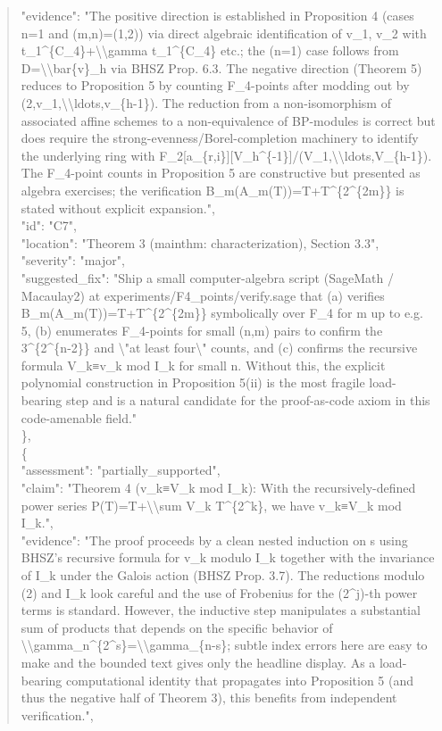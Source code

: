 \documentclass[11pt]{article}
\begin{document}
\begin{quote}
      "evidence": "The positive direction is established in Proposition 4 (cases n=1 and (m,n)=(1,2)) via direct algebraic identification of v\_1, v\_2 with t\_1\^{}\{C\_4\}+\textbackslash{}\textbackslash{}gamma t\_1\^{}\{C\_4\} etc.; the (n=1) case follows from D=\textbackslash{}\textbackslash{}bar\{v\}\_h via BHSZ Prop. 6.3. The negative direction (Theorem 5) reduces to Proposition 5 by counting F\_4-points after modding out by (2,v\_1,\textbackslash{}\textbackslash{}ldots,v\_\{h-1\}). The reduction from a non-isomorphism of associated affine schemes to a non-equivalence of BP-modules is correct but does require the strong-evenness/Borel-completion machinery to identify the underlying ring with F\_2[a\_\{r,i\}][V\_h\^{}\{-1\}]/(V\_1,\textbackslash{}\textbackslash{}ldots,V\_\{h-1\}). The F\_4-point counts in Proposition 5 are constructive but presented as algebra exercises; the verification B\_m(A\_m(T))=T+T\^{}\{2\^{}\{2m\}\} is stated without explicit expansion.",\\
      "id": "C7",\\
      "location": "Theorem 3 (mainthm: characterization), Section 3.3",\\
      "severity": "major",\\
      "suggested\_fix": "Ship a small computer-algebra script (SageMath / Macaulay2) at experiments/F4\_points/verify.sage that (a) verifies B\_m(A\_m(T))=T+T\^{}\{2\^{}\{2m\}\} symbolically over F\_4 for m up to e.g. 5, (b) enumerates F\_4-points for small (n,m) pairs to confirm the 3\^{}\{2\^{}\{n-2\}\} and \textbackslash{}"at least four\textbackslash{}" counts, and (c) confirms the recursive formula V\_k≡v\_k mod I\_k for small n. Without this, the explicit polynomial construction in Proposition 5(ii) is the most fragile load-bearing step and is a natural candidate for the proof-as-code axiom in this code-amenable field."\\
    \},\\
    \{\\
      "assessment": "partially\_supported",\\
      "claim": "Theorem 4 (v\_k≡V\_k mod I\_k): With the recursively-defined power series P(T)=T+\textbackslash{}\textbackslash{}sum V\_k T\^{}\{2\^{}k\}, we have v\_k≡V\_k mod I\_k.",\\
      "evidence": "The proof proceeds by a clean nested induction on s using BHSZ's recursive formula for v\_k modulo I\_k together with the invariance of I\_k under the Galois action (BHSZ Prop. 3.7). The reductions modulo (2) and I\_k look careful and the use of Frobenius for the (2\^{}j)-th power terms is standard. However, the inductive step manipulates a substantial sum of products that depends on the specific behavior of \textbackslash{}\textbackslash{}gamma\_n\^{}\{2\^{}s\}=\textbackslash{}\textbackslash{}gamma\_\{n-s\}; subtle index errors here are easy to make and the bounded text gives only the headline display. As a load-bearing computational identity that propagates into Proposition 5 (and thus the negative half of Theorem 3), this benefits from independent verification.",\\

\end{quote}
\end{document}
